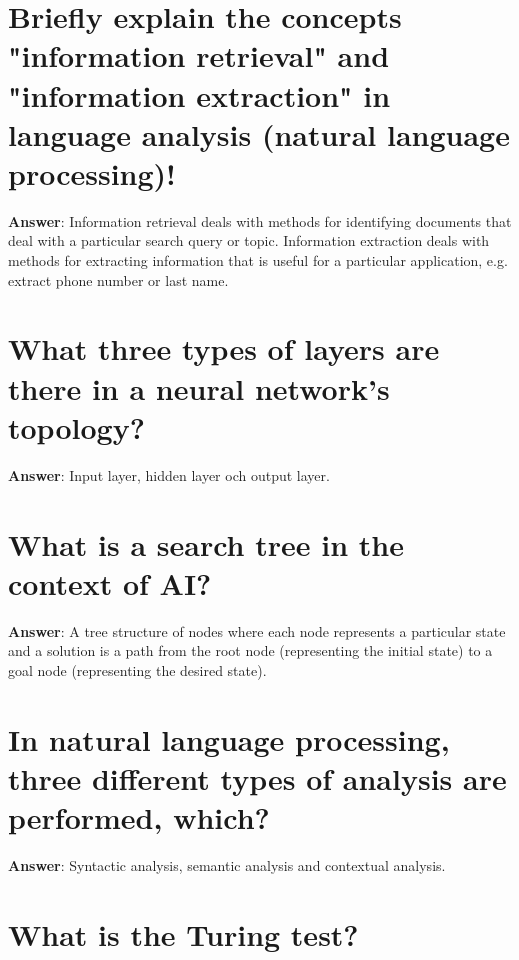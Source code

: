 \documentclass[a4paper,11pt,oneside]{book}
\begin{document}
\begin{sloppypar}
\section{Briefly explain the concepts "information retrieval" and "information extraction" in language analysis (natural language processing)!}

\label{q:318:sa:en:True}

\textbf{Answer}: Information retrieval deals with methods for identifying documents that deal with a particular search query or topic. Information extraction deals with methods for extracting information that is useful for a particular application, e.g. extract phone number or last name.



\section{What three types of layers are there in a neural network's topology?}

\label{q:319:sa:en:True}

\textbf{Answer}: Input layer, hidden layer och output layer.



\section{What is a search tree in the context of AI?}

\label{q:320:sa:en:True}

\textbf{Answer}: A tree structure of nodes where each node represents a particular state and a solution is a path from the root node (representing the initial state) to a goal node (representing the desired state).



\section{In natural language processing, three different types of analysis are performed, which?}

\label{q:321:sa:en:True}

\textbf{Answer}: Syntactic analysis, semantic analysis and contextual analysis.



\section{What is the Turing test?}


\end{sloppypar}
\end{document}
